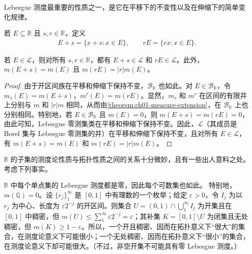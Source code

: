 \documentclass[../../main.tex]{subfiles}%
\begin{document}
Lebesgue 测度最重要的性质之一，是它在平移下的不变性以及在伸缩下的简单变化规律。
\begin{definition}[集合的平移与伸缩]\label{definition:ch01-lebesgue-invariance-intro}
若 $E\subseteq\mathbb{R}$ 且 $s,r\in\mathbb{R}$，定义
\begin{align*}
E+s=\{x+s:x\in E\},\qquad rE=\{rx:x\in E\}.
\end{align*}
\end{definition}


\begin{theorem}\label{theorem:ch01-lebesgue-invariance}
若 $E\in\mathscr{L}$，则对所有 $s,r\in\mathbb{R}$，都有 $E+s\in\mathscr{L}$ 和 $rE\in\mathscr{L}$。此外，$m(E+s)=m(E)$ 且 $m(rE)=|r|m(E)$。
\end{theorem}

\begin{proof}
由于开区间族在平移和伸缩下保持不变，$\mathscr{B}_{\mathbb{R}}$ 也如此。对 $E\in\mathscr{B}_{\mathbb{R}}$，令 $m_s(E)=m(E+s)$，$m^r(E)=m(rE)$。显然，$m_s$ 和 $m^r$ 在区间的有限并上分别与 $m$ 和 $|r|m$ 相同，从而由\cref{theorem:ch01-measure-extension}，在 $\mathscr{B}_{\mathbb{R}}$ 上也分别相同。特别地，若 $E\in\mathscr{B}_{\mathbb{R}}$ 且 $m(E)=0$，则 $m(E+s)=m(rE)=0$，由此可知，Lebesgue 零测集类在平移和伸缩下保持不变。因此，$\mathscr{L}$（其成员是 Borel 集与 Lebesgue 零测集的并）在平移和伸缩下保持不变，且对所有 $E\in\mathscr{L}$，有 $m(E+s)=m(E)$ 和 $m(rE)=|r|m(E)$。
\end{proof}

$\mathbb{R}$ 的子集的测度论性质与拓扑性质之间的关系十分微妙，且有一些出人意料之处。考虑下列事实。
\begin{example}\label{example:ch01-measure-topology-example}
$\mathbb{R}$ 中每个单点集的 Lebesgue 测度都是零，因此每个可数集也如此。
特别地，$m(\mathbb{Q})=0$。设 $\{r_j\}_1^\infty$ 是 $[0,1]$ 中有理数的一个枚举；给定 $\varepsilon>0$，令 $I_j$ 为以 $r_j$ 为中心、长度为 $\varepsilon2^{-j}$ 的开区间。则集合 $U=(0,1)\cap\bigcup_1^\infty I_j$ 为开集且在 $[0,1]$ 中稠密，但 $m(U)\leqslant\sum_1^\infty\varepsilon2^{-j}=\varepsilon$；其补集 $K=[0,1]\setminus U$ 为闭集且无处稠密，但 $m(K)\geqslant1-\varepsilon$。所以，一个开且稠密、因而在拓扑意义下“很大”的集合，在测度论意义下可能很小；一个无处稠密、因而在拓扑意义下“很小”的集合，在测度论意义下却可能很大。（不过，非空开集不可能具有零 Lebesgue 测度。）
\end{example}
\end{document}
